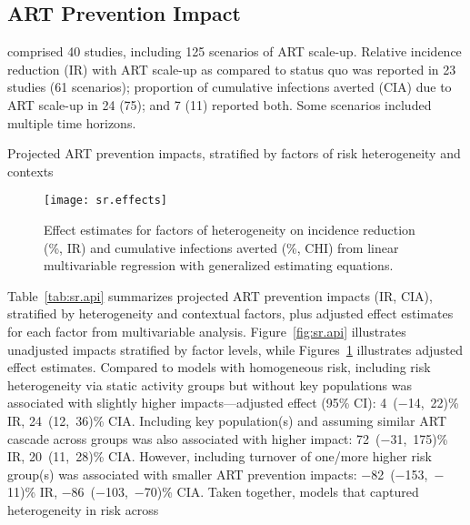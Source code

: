 \subsection{ART Prevention Impact}\label{sr.res.api}
 comprised 40 studies, including 125 scenarios of ART scale-up.
Relative incidence reduction (IR) with ART scale-up as compared to status quo
was reported in 23 studies (61 scenarios);
proportion of cumulative infections averted (CIA) due to ART scale-up
in 24 (75); and 7 (11) reported both.
Some scenarios included multiple time horizons.
\begin{table}
  \centering
  \caption{Projected ART prevention impacts,
    stratified by factors of risk heterogeneity and contexts}
  \label{tab:sr.api}
  
\end{table}
\begin{figure}[h]
  \centering
  \texttt{[image: sr.effects]}
  \caption{Effect estimates for factors of heterogeneity on
    incidence reduction (\%, IR) and cumulative infections averted (\%, CHI)
    from linear multivariable regression with generalized estimating equations.}
  \label{fig:sr.effects}
\end{figure}
Table~\ref{tab:sr.api} summarizes projected ART prevention impacts (IR, CIA),
stratified by heterogeneity and contextual factors,
plus adjusted effect estimates for each factor from multivariable analysis.
Figure~\ref{fig:sr.api} illustrates
unadjusted impacts stratified by factor levels, while
Figures~\ref{fig:sr.effects} illustrates adjusted effect estimates.
Compared to models with homogeneous risk,
including risk heterogeneity via static activity groups but without key populations
was associated with slightly higher impacts---adjusted effect (95\% CI):
4~($-$14,~22)\% IR, 24~(12,~36)\% CIA.
Including key population(s) and assuming similar ART cascade across groups
was also associated with higher impact:
72~($-$31,~175)\% IR, 20~(11,~28)\% CIA.
However, including turnover of one/more higher risk group(s)
was associated with smaller ART prevention impacts:
$-$82~($-$153,~$-$11)\% IR, $-$86~($-$103,~$-$70)\% CIA.
Taken together, models that captured heterogeneity in risk across
